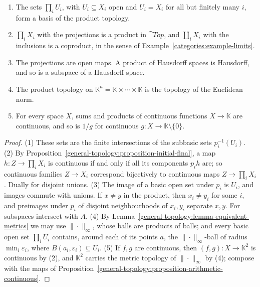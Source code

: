 \begin{proposition}\label{general-topology:proposition-product}
\begin{enumerate}
\item The sets $\prod_i U_i$, with $U_i \subseteq X_i$ open and $U_i = X_i$ for all but finitely many $i$, form a basis of the product topology.
\item $\prod_i X_i$ with the projections is a product in $\cat{Top}$, and $\coprod_i X_i$ with the inclusions is a coproduct, in the sense of
Example~\ref{categories:example-limits}.
\item The projections are open maps. A product of Hausdorff spaces is Hausdorff, and so is a subspace of a Hausdorff space.
\item The product topology on $\mathbb{K}^n = \mathbb{K} \times \cdots \times \mathbb{K}$ is the topology of the Euclidean norm.
\item For every space $X$, sums and products of continuous functions $X \to \mathbb{K}$ are continuous, and so is $1/g$ for continuous
$g \colon X \to \mathbb{K} \setminus \{0\}$.
\end{enumerate}
\end{proposition}

\begin{proof}
(1) These sets are the finite intersections of the subbasic sets $p_i^{-1}(U_i)$. (2) By
Proposition~\ref{general-topology:proposition-initial-final}, a map $h \colon Z \to \prod_i X_i$ is continuous if and only if all its components $p_i h$
are; so continuous families $Z \to X_i$ correspond bijectively to continuous maps $Z \to \prod_i X_i$. Dually for disjoint unions. (3) The image of a
basic open set under $p_i$ is $U_i$, and images commute with unions. If $x \neq y$ in the product, then $x_i \neq y_i$ for some $i$, and preimages under
$p_i$ of disjoint neighbourhoods of $x_i, y_i$ separate $x, y$. For subspaces intersect with $A$. (4) By
Lemma~\ref{general-topology:lemma-equivalent-metrics} we may use $\|\cdot\|_\infty$, whose balls are products of balls; and every basic open set
$\prod_i U_i$ contains, around each of its points $a$, the $\|\cdot\|_\infty$-ball of radius $\min_i \varepsilon_i$, where $B(a_i, \varepsilon_i) \subseteq U_i$.
(5) If $f, g$ are continuous, then $(f, g) \colon X \to \mathbb{K}^2$ is continuous by (2), and $\mathbb{K}^2$ carries the metric topology of
$\|\cdot\|_\infty$ by (4); compose with the maps of Proposition~\ref{general-topology:proposition-arithmetic-continuous}.
\end{proof}


